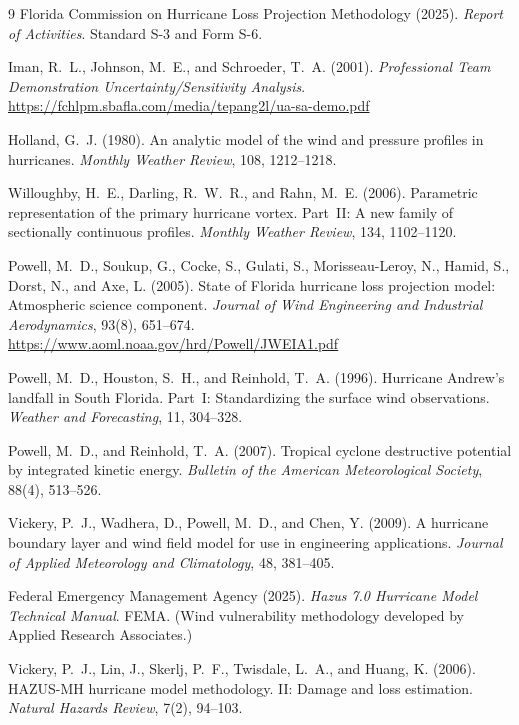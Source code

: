 \documentclass[11pt]{article}
\begin{document}
\begin{thebibliography}{9}
 Florida Commission on Hurricane Loss Projection Methodology (2025).
\emph{Report of Activities}. Standard S-3 and Form S-6.

 Iman, R.~L., Johnson, M.~E., and Schroeder, T.~A. (2001).
\emph{Professional Team Demonstration Uncertainty/Sensitivity Analysis}.
\url{https://fchlpm.sbafla.com/media/tepang2l/ua-sa-demo.pdf}

 Holland, G.~J. (1980). An analytic model of the wind and pressure
profiles in hurricanes. \emph{Monthly Weather Review}, 108, 1212--1218.

 Willoughby, H.~E., Darling, R.~W.~R., and Rahn, M.~E. (2006).
Parametric representation of the primary hurricane vortex. Part~II: A new family of
sectionally continuous profiles. \emph{Monthly Weather Review}, 134, 1102--1120.

 Powell, M.~D., Soukup, G., Cocke, S., Gulati, S.,
Morisseau-Leroy, N., Hamid, S., Dorst, N., and Axe, L. (2005). State of Florida
hurricane loss projection model: Atmospheric science component.
\emph{Journal of Wind Engineering and Industrial Aerodynamics}, 93(8), 651--674.
\url{https://www.aoml.noaa.gov/hrd/Powell/JWEIA1.pdf}

 Powell, M.~D., Houston, S.~H., and Reinhold, T.~A. (1996).
Hurricane Andrew's landfall in South Florida. Part~I: Standardizing the surface
wind observations. \emph{Weather and Forecasting}, 11, 304--328.

 Powell, M.~D., and Reinhold, T.~A. (2007).
Tropical cyclone destructive potential by integrated kinetic energy.
\emph{Bulletin of the American Meteorological Society}, 88(4), 513--526.

 Vickery, P.~J., Wadhera, D., Powell, M.~D., and Chen, Y. (2009).
A hurricane boundary layer and wind field model for use in engineering applications.
\emph{Journal of Applied Meteorology and Climatology}, 48, 381--405.

 Federal Emergency Management Agency (2025). \emph{Hazus 7.0
Hurricane Model Technical Manual}. FEMA. (Wind vulnerability methodology developed
by Applied Research Associates.)

 Vickery, P.~J., Lin, J., Skerlj, P.~F., Twisdale, L.~A.,
and Huang, K. (2006). HAZUS-MH hurricane model methodology. II: Damage and loss
estimation. \emph{Natural Hazards Review}, 7(2), 94--103.


\end{thebibliography}
\end{document}

